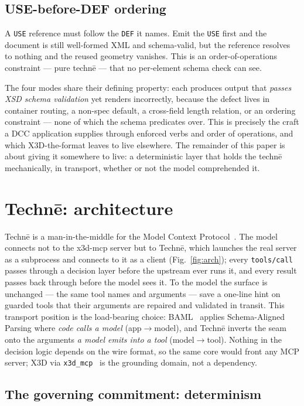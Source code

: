 \documentclass[sigconf,nonacm,screen,anonymous]{acmart}
\begin{document}
\subsection{USE-before-DEF ordering}
A \texttt{USE} reference must follow the \texttt{DEF} it names. Emit the \texttt{USE} first and the document is still well-formed XML and schema-valid, but the reference resolves to nothing and the reused geometry vanishes. This is an order-of-operations constraint --- pure technē --- that no per-element schema check can see.

The four modes share their defining property: each produces output that \emph{passes XSD schema validation} yet renders incorrectly, because the defect lives in container routing, a non-spec default, a cross-field length relation, or an ordering constraint --- none of which the schema predicates over. This is precisely the craft a DCC application supplies through enforced verbs and order of operations, and which X3D-the-format leaves to live elsewhere. The remainder of this paper is about giving it somewhere to live: a deterministic layer that holds the technē mechanically, in transport, whether or not the model comprehended it.

\section{Technē: architecture}
\label{sec:arch}

Technē is a man-in-the-middle for the Model Context Protocol~\cite{mcp}. The model connects not to the x3d-mcp server but to Technē, which launches the real server as a subprocess and connects to it as a client (Fig.~\ref{fig:arch}); every \texttt{tools/call} passes through a decision layer before the upstream ever runs it, and every result passes back through before the model sees it. To the model the surface is unchanged --- the same tool names and arguments --- save a one-line hint on guarded tools that their arguments are repaired and validated in transit. This transport position is the load-bearing choice: BAML~\cite{baml} applies Schema-Aligned Parsing where \emph{code calls a model} (app$\rightarrow$model), and Technē inverts the seam onto the arguments \emph{a model emits into a tool} (model$\rightarrow$tool). Nothing in the decision logic depends on the wire format, so the same core would front any MCP server; X3D via \texttt{x3d\_mcp}~\cite{x3dpy} is the grounding domain, not a dependency.

\subsection{The governing commitment: determinism}
\end{document}
